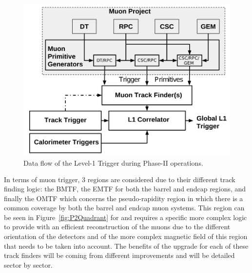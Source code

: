 	\begin{figure}[H]
		\centering
		\includegraphics[width=\plotwidth]{fig/chapt3/Phase-II-L1-Trigger.png}
		\caption{\label{fig:L1-trigger} Data flow of the Level-1 Trigger during Phase-II operations.}
	\end{figure}
	
	In terms of muon trigger, 3 regions are considered due to their different track finding logic: the \acf{BMTF}, the \acf{EMTF} for both the barrel and endcap regions, and finally the \acf{OMTF} which concerns the pseudo-rapidity region in which there is a common coverage by both the barrel and endcap muon systems. This region can be seen in Figure~\ref{fig:P2Quadrant} for  and requires a specific more complex logic to provide with an efficient reconstruction of the muons due to the different orientation of the detectors and of the more complex magnetic field of this region that needs to be taken into account. The benefits of the upgrade for each of these track finders will be coming from different improvements and will be detailed sector by sector.\\
	
